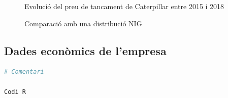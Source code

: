 \documentclass{article}
\numberwithin{table}{section}
\numberwithin{figure}{section}
\numberwithin{equation}{section}
\begin{document}
\begin{figure}[htb]
	\centering \sffamily \small
	
	\caption{Evolució del preu de tancament de Caterpillar entre 2015 i 2018}
	\label{fig:distribucio rendibilitats}
\end{figure}
\begin{figure}[htb]
	\centering \sffamily \small
	
	\caption{Comparació amb una distribució NIG}
	\label{fig:comparacio nig}
\end{figure}
\subsection{Dades econòmics de l'empresa}

\begin{lstlisting}[language=R, caption=Codi per simular el model amb \( q_1 \), label={lst:codi 1}]
# Comentari

Codi R
\end{lstlisting}
\end{document}

